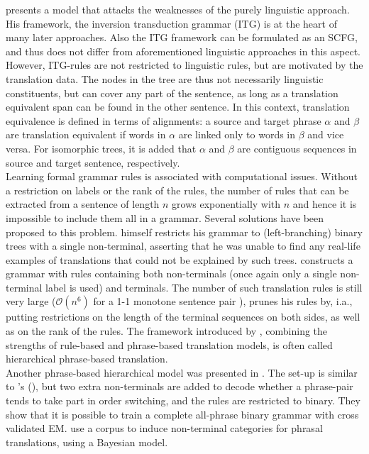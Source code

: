 \documentclass{report}
\theoremstyle{definition}
\theoremstyle{plain}
\def\citepos#1{\citeauthor{#1}'s (\citeyear{#1})}
\begin{document}
\cite{wu1997stochastic} presents a model that attacks the weaknesses of the purely linguistic approach. His framework, the inversion transduction grammar (ITG) is at the heart of many later approaches. Also the ITG framework can be formulated as an SCFG, and thus does not differ from aforementioned linguistic approaches in this aspect. However, ITG-rules are not restricted to linguistic rules, but are motivated by the translation data. The nodes in the tree are thus not necessarily linguistic constituents, but can cover any part of the sentence, as long as a translation equivalent span can be found in the other sentence. In this context, translation equivalence is defined in terms of alignments: a source and target phrase $\alpha$ and $\beta$ are translation equivalent if words in $\alpha$ are linked only to words in $\beta$ and vice versa. For isomorphic trees, it is added that $\alpha$ and $\beta$ are contiguous sequences in source and target sentence, respectively.\\
Learning formal grammar rules is associated with computational issues. Without a restriction on labels or the rank of the rules, the number of rules that can be extracted from a sentence of length $n$ grows exponentially with $n$ and hence it is impossible to include them all in a grammar. Several solutions have been proposed to this problem. \citeauthor{wu1997stochastic} himself restricts his grammar to (left-branching) binary trees with a single non-terminal, asserting that he was unable to find any real-life examples of translations that could not be explained by such trees. \cite{chiang2005hierarchical} constructs a grammar with rules containing both non-terminals (once again only a single non-terminal label is used) and terminals. The number of such translation rules is still very large ($\mathcal{O}(n^6)$ for a 1-1 monotone sentence pair \citep{quirk2005dependency}), \citeauthor{chiang2005hierarchical} prunes his rules by, i.a., putting restrictions on the length of the terminal sequences on both sides, as well as on the rank of the rules. The framework introduced by \citeauthor{chiang2007hierarchical}, combining the strengths of rule-based and phrase-based translation models, is often called hierarchical phrase-based translation. \\
Another phrase-based hierarchical model was presented in \cite{mylonakis2010learning}. The set-up is similar to \citepos{chiang2007hierarchical}, but two extra non-terminals are added to decode whether a phrase-pair tends to take part in order switching, and the rules are restricted to binary. They show that it is possible to train a complete all-phrase binary grammar with cross validated EM. \cite{blunsom2008bayesian} use a corpus to induce non-terminal categories for phrasal translations, using a Bayesian model.
\end{document}
